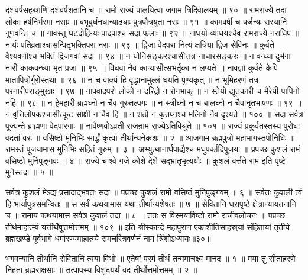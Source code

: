 दशवर्षसहस्राणि दशवर्षशतानि च ॥
रामो राज्यं पालयित्वा जगाम त्रिदिवालयम् ॥ ९० ॥
रामराज्ये तदा लोका हर्षनिर्भरमा नसाः ॥
बभूवुर्धनधान्याढ्याः पुत्रपौत्रयुता नराः ॥ ९१ ॥
कामवर्षी च पर्जन्यः सस्यानि गुणवन्ति च ॥
गावस्तु घटदोहिन्यः पादपाश्च सदा फलाः ॥ ९२ ॥
नाधयो व्याधयश्चैव रामराज्ये नराधिप ॥
नार्यः पतिव्रताश्चासन्पितृभक्तिपरा नराः ॥ ९३ ॥
द्विजा वेदपरा नित्यं क्षत्रिया द्विज सेविनः ॥
कुर्वते वैश्यवर्णाश्च भक्तिं द्विजगवां सदा ॥ ९४ ॥
न योनिसङ्करश्चासीत्तत्र नाचारसङ्करः ॥
न वन्ध्या दुर्भगा नारी काकवन्ध्या मृत प्रजा ॥ ९५ ॥
विधवा नैव काप्यासीत्सभर्तृका न लप्यते ॥
नावज्ञां कुर्वते केपि मातापित्रोर्गुरोस्तथा ॥ ९६ ॥
न च वाक्यं हि वृद्धानामुल्लं घयति पुण्यकृत् ॥
न भूमिहरणं तत्र परनारीपराङ्मुखाः ॥ ९७ ॥
नापवादपरो लोको न दरिद्रो न रोगभाक् ॥
न स्तेयो द्यूतकारी च मैरेयी पापिनो नहि ॥ ९८ ॥
न हेमहारी ब्रह्मघ्नो न चैव गुरुतल्पगः ॥
न स्त्रीघ्नो न च बालघ्नो न चैवानृतभाषणः ॥ ९९ ॥
न वृत्तिलोपकश्चासीत्कूट साक्षी न चैव हि ॥
न शठो न कृतघ्नश्च मलिनो नैव दृश्यते ॥ १०० ॥
सदा सर्वत्र पूज्यन्ते ब्राह्मणा वेदपारगाः ॥
नावैष्णवोऽव्रती राजन्राम राज्येऽतिविश्रुते ॥ १०१ ॥
राज्यं प्रकुर्वतस्तस्य पुरोधा वदतां वरः ॥
वसिष्ठो मुनिभिः सार्द्धं कृत्वा तीर्थान्यनेकशः ॥ २ ॥
आजगाम ब्रह्मपुत्रो महाभागस्तपोनिधिः ॥
रामस्तं पूजयामास मुनिभिः सहितं गुरुम् ॥ ३ ॥
अभ्युत्थानार्घपाद्यैश्च मधुपर्कादिपूजया ॥
प्रपच्छ कुशलं रामं वसिष्ठो मुनिपुङ्गवः ॥ ४ ॥
राज्ये चाश्वे गजे कोशे देशे सद्भ्रातृभृत्ययोः ॥
कुशलं वर्त्तते राम इति पृष्टे मुनेस्तदा ॥ ५ ॥

सर्वत्र कुशलं मेऽद्य प्रसादाद्भवतः सदा ॥
पप्रच्छ कुशलं रामो वसिष्ठं मुनिपुङ्गवम् ॥ ६ ॥
सर्वतः कुशली त्वं हि भार्यापुत्रसमन्वितः ॥
स सर्वं कथयामास यथा तीर्थान्यशेषतः ॥ ७ ॥
सेवितानि धरापृष्ठे क्षेत्राण्यायतनानि च ॥
रामाय कथयामास सर्वत्र कुशलं तदा ॥ ८ ॥
ततः स विस्मयाविष्टो रामो राजीवलोचनः ॥
पप्रच्छ तीर्थमाहात्म्यं यत्तीर्थेषूत्तमोत्तमम् ॥ १०९ ॥
इति श्रीस्कान्दे महापुराण एकाशीतिसाहस्र्यां संहितायां तृतीये ब्रह्मखण्डे पूर्वभागे धर्मारण्यमाहात्म्ये रामचरित्रवर्णनं नाम त्रिंशोऽध्यायः॥३०॥



भगवन्यानि तीर्थानि सेवितानि त्वया विभो ॥
एतेषां परमं तीर्थं तन्ममाचक्ष्व मानद ॥ १ ॥
मया तु सीताहरणे निहता ब्रह्मराक्षसाः ॥
तत्पापस्य विशुदयर्थं वद तीर्थोत्तमोत्तमम् ॥ २ ॥

